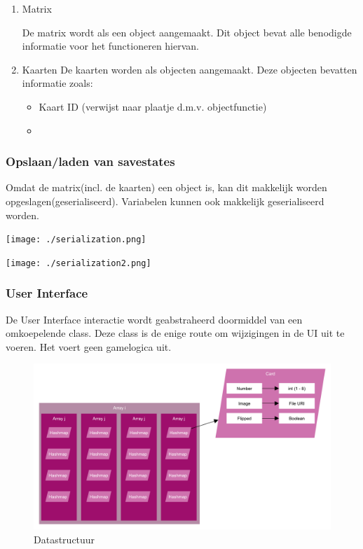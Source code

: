 \documentclass[a4paper,titlepage,11pt]{article}
\begin{document}
\begin{enumerate}
\item Matrix

De matrix wordt als een object aangemaakt. 
Dit object bevat alle benodigde informatie
voor het functioneren hiervan.

\item Kaarten
De kaarten worden als objecten aangemaakt. Deze objecten bevatten informatie zoals:

\begin{itemize}
\item Kaart ID (verwijst naar plaatje d.m.v. objectfunctie)
\item 
\end{itemize}
\end{enumerate}

\subsubsection{Opslaan/laden van savestates}

Omdat de matrix(incl. de kaarten) een object is,
kan dit makkelijk worden opgeslagen(geserialiseerd).
Variabelen kunnen ook makkelijk geserialiseerd worden.

\begin{center}
\texttt{[image: ./serialization.png]}
\end{center}

\begin{center}
\texttt{[image: ./serialization2.png]}
\end{center}

\subsubsection{User Interface}

De User Interface interactie wordt geabstraheerd doormiddel van een omkoepelende class.
Deze class is de enige route om wijzigingen in de UI uit te voeren.
Het voert geen gamelogica uit.

\begin{figure}[!hb]
  \includegraphics[width=\linewidth]{../Images/datastructure.pdf}
  \caption{Datastructuur}\label{fig:datastructure}
\end{figure}
\end{document}
